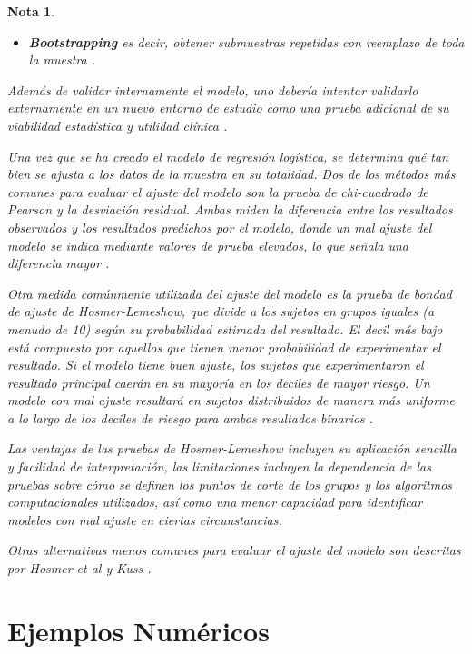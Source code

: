 \documentclass[12pt]{article}
\newtheorem{Note}{Nota}%
\begin{document}
\begin{Note}
\begin{itemize}
\item[d) ] \textbf{Bootstrapping} es decir, obtener submuestras repetidas con reemplazo de toda la muestra \cite{kohavi1995,efron1993}.
\end{itemize}

Adem\'as de validar internamente el modelo, uno deber\'ia intentar validarlo externamente en un nuevo entorno de estudio como una prueba adicional de su viabilidad estad\'istica y utilidad cl\'inica \cite{altman2000,miller1991}.

Una vez que se ha creado el modelo de regresi\'on log\'istica, se determina qu\'e tan bien se ajusta a los datos de la muestra en su totalidad. Dos de los m\'etodos m\'as comunes para evaluar el ajuste del modelo son la prueba de chi-cuadrado de Pearson y la desviaci\'on residual. Ambas miden la diferencia entre los resultados observados y los resultados predichos por el modelo, donde un mal ajuste del modelo se indica mediante valores de prueba elevados, lo que se\~nala una diferencia mayor \cite{hosmer2000, hosmer1997, kuss2002}. \medskip

Otra medida com\'unmente utilizada del ajuste del modelo es la prueba de bondad de ajuste de \textit{Hosmer-Lemeshow}, que divide a los sujetos en grupos iguales (a menudo de 10) seg\'un su probabilidad estimada del resultado. El decil m\'as bajo est\'a compuesto por aquellos que tienen menor probabilidad de experimentar el resultado. Si el modelo tiene buen ajuste, los sujetos que experimentaron el resultado principal caer\'an en su mayor\'ia en los deciles de mayor riesgo. Un modelo con mal ajuste resultar\'a en sujetos distribuidos de manera m\'as uniforme a lo largo de los deciles de riesgo para ambos resultados binarios \cite{tabachnick2007, hosmer2000}.\medskip

Las ventajas de las pruebas de Hosmer-Lemeshow incluyen su aplicaci\'on sencilla y facilidad de interpretaci\'on, las limitaciones incluyen la dependencia de las pruebas sobre c\'omo se definen los puntos de corte de los grupos y los algoritmos computacionales utilizados, as\'i como una menor capacidad para identificar modelos con mal ajuste en ciertas circunstancias.  \medskip

Otras alternativas menos comunes para evaluar el ajuste del modelo son descritas por Hosmer et al \cite{hosmer1997} y Kuss \cite{kuss2002}.

\end{Note}
\section{Ejemplos Num\'ericos}
\end{document}

